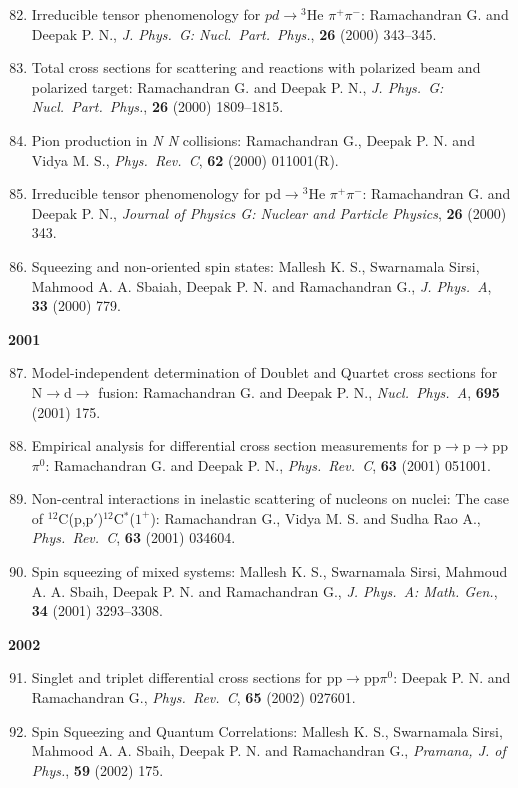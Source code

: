 \begin{enumerate}
\setcounter{enumi}{81}
\item Irreducible tensor phenomenology for $pd\to {}^{3}$He $\pi^{+}\pi^{-}$: Rama\-chandran G. and Deepak P. N., \textit{J. Phys.\ G: Nucl.\ Part.\ Phys.}, {\bf 26} (2000) 343--345.
\item Total cross sections for scattering and reactions with polarized beam and polarized target: Ramachandran G. and Deepak P. N., \textit{J. Phys.\ G: Nucl.\ Part.\ Phys.}, {\bf 26} (2000) 1809--1815.
\item Pion production in \textit{N N} collisions: Ramachandran G., Deepak P. N. and Vidya M. S., \textit{Phys.\ Rev.\ C}, {\bf 62} (2000) 011001(R).
\item Irreducible tensor phenomenology for pd$\to{}^{3}$He $\pi^{+}\pi^{-}$: Ramachandran G. and Deepak P. N., \textit{Journal of Physics G: Nuclear and Particle Physics}, {\bf 26} (2000) 343.
\item Squeezing and non-oriented spin states: Mallesh K. S., Swarnamala Sirsi, Mahmood A. A. Sbaiah, Deepak P. N. and Ramachandran G., \textit{J. Phys.\ A}, {\bf 33} (2000) 779.
\end{enumerate}
\textbf{2001}
\begin{enumerate}
\setcounter{enumi}{86}
\item Model-independent determination of Doublet and Quartet cross sections for N$\to$d$\to$ fusion: Ramachandran G. and Deepak P. N., \textit{Nucl.\ Phys.\  A}, {\bf 695} (2001) 175.
\item Empirical analysis for differential cross section measurements for p$\to$p$\to$pp$\pi^{0}$: Ramachandran G. and Deepak P. N., \textit{Phys.\ Rev.\ C}, {\bf 63} (2001) 051001.
\item Non-central interactions in inelastic scattering of nucleons on nuclei: The case of $^{12}$C(p,p$'$)$^{12}$C$^{*}$($1^{+}$): Ramachandran G., Vidya M. S. and Sudha Rao A., \textit{Phys.\ Rev.\ C}, {\bf 63} (2001) 034604.
\item Spin squeezing of mixed systems: Mallesh K. S., Swarnamala Sirsi, Mahmoud A. A. Sbaih, Deepak P. N. and Ramachandran G., \textit{J. Phys.\ A: Math. Gen.}, {\bf 34} (2001) 3293--3308.
\end{enumerate}
\textbf{2002}
\begin{enumerate}
\setcounter{enumi}{90}
\item Singlet and triplet differential cross sections for pp$\to$pp$\pi^{0}$: Deepak P. N. and Ramachandran G., \textit{Phys.\ Rev.\ C}, {\bf 65} (2002) 027601.
\item Spin Squeezing and Quantum Correlations: Mallesh K. S., Swarnamala Sirsi, Mahmood A. A. Sbaih, Deepak P. N. and Ramachandran G., \textit{Pramana, J. of
Phys.}, {\bf 59} (2002) 175.
\end{enumerate}
